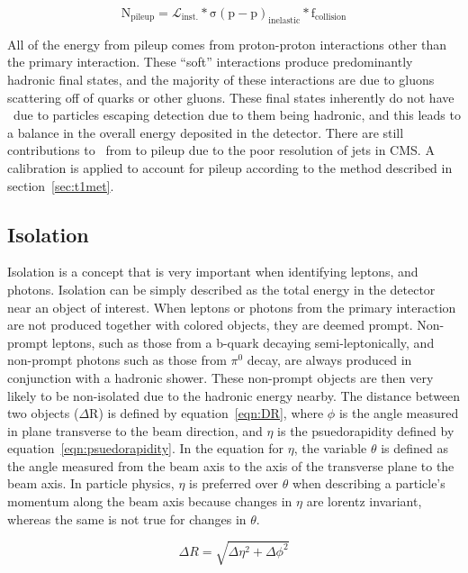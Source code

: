\begin{equation}
\label{eqn:pileup}
  \mathrm{N_{pileup} = \mathcal{L}_{inst.}*\sigma(p-p)_{inelastic}*f_{collision}}
\end{equation}

All of the energy from pileup comes from proton-proton interactions other than the primary interaction.
These ``soft'' interactions produce predominantly hadronic final states,
and the majority of these interactions are due to gluons scattering off of quarks or other gluons.
These final states inherently do not have \MET\ due to particles escaping detection due to them being hadronic,
and this leads to a balance in the overall energy deposited in the detector.
There are still contributions to \MET\ from to pileup due to the poor resolution of jets in CMS.
A calibration is applied to account for pileup according to the method described in section~\ref{sec:t1met}.


\subsection{Isolation}
\label{ssec:isolation_summary}
Isolation is a concept that is very important when identifying leptons, and photons.
Isolation can be simply described as the total energy in the detector near an object of interest.
When leptons or photons from the primary interaction are not produced together with colored objects,
they are deemed prompt.
Non-prompt leptons, such as those from a b-quark decaying semi-leptonically,
and non-prompt photons such as those from $\pi ^{0}$ decay,
are always produced in conjunction with a hadronic shower.
These non-prompt objects are then very likely to be non-isolated due to the hadronic energy nearby.
The distance between two objects ($\Delta$R) is defined by equation~\ref{eqn:DR},
where $\phi$ is the angle measured in plane transverse to the beam direction,
and $\eta$ is the psuedorapidity defined by equation~\ref{eqn:psuedorapidity}.
In the equation for $\eta$, the variable $\theta$ is defined as the angle measured from the beam axis to the axis of the transverse plane to the beam axis.
In particle physics, $\eta$ is preferred over $\theta$ when describing a particle's momentum along the beam axis because changes in $\eta$ are lorentz invariant,
whereas the same is not true for changes in $\theta$.

\begin{equation}
  \label{eqn:DR}
  \Delta R = \sqrt{\Delta\eta^{2}+\Delta\phi^{2}}
\end{equation}

